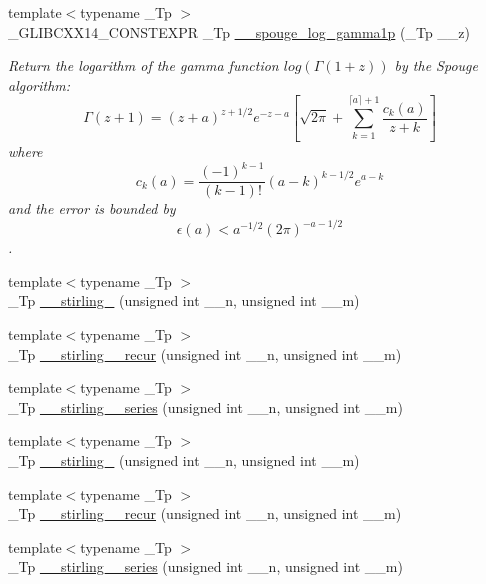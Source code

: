 \begin{DoxyCompactItemize}
{\footnotesize template$<$typename \+\_\+\+Tp $>$ }\\\+\_\+\+G\+L\+I\+B\+C\+X\+X14\+\_\+\+C\+O\+N\+S\+T\+E\+X\+PR \+\_\+\+Tp \hyperlink{namespacestd_1_1____detail_a29cdf96d3726e15cb0652736971ba5a9}{\+\_\+\+\_\+spouge\+\_\+log\+\_\+gamma1p} (\+\_\+\+Tp \+\_\+\+\_\+z)
\begin{DoxyCompactList}\small\item\em Return the logarithm of the gamma function $ log(\Gamma(1+z)) $ by the Spouge algorithm\+: \[ \Gamma(z+1) = (z+a)^{z+1/2}e^{-z-a}\left[ \sqrt{2\pi} + \sum_{k=1}^{\lceil a \rceil + 1}\frac{c_k(a)}{z+k}\right] \] where \[ c_k(a) = \frac{(-1)^{k-1}}{(k-1)!}(a-k)^{k-1/2}e^{a-k} \] and the error is bounded by \[ \epsilon(a) < a^{-1/2}(2\pi)^{-a-1/2} \]. \end{DoxyCompactList}\item 
{\footnotesize template$<$typename \+\_\+\+Tp $>$ }\\\+\_\+\+Tp \hyperlink{namespacestd_1_1____detail_a8b215e4ca28ec9b7b078d7f3d9aecc17}{\+\_\+\+\_\+stirling\+\_} (unsigned int \+\_\+\+\_\+n, unsigned int \+\_\+\+\_\+m)
\item 
{\footnotesize template$<$typename \+\_\+\+Tp $>$ }\\\+\_\+\+Tp \hyperlink{namespacestd_1_1____detail_a0a47b5d34956a55f438f2ba079680acd}{\+\_\+\+\_\+stirling\+\_\+\_\+recur} (unsigned int \+\_\+\+\_\+n, unsigned int \+\_\+\+\_\+m)
\item 
{\footnotesize template$<$typename \+\_\+\+Tp $>$ }\\\+\_\+\+Tp \hyperlink{namespacestd_1_1____detail_adb65db9b399228c604c5f72156695965}{\+\_\+\+\_\+stirling\+\_\+\_\+series} (unsigned int \+\_\+\+\_\+n, unsigned int \+\_\+\+\_\+m)
\item 
{\footnotesize template$<$typename \+\_\+\+Tp $>$ }\\\+\_\+\+Tp \hyperlink{namespacestd_1_1____detail_a4589d459a7a9d1d9e19b33601238a4af}{\+\_\+\+\_\+stirling\+\_} (unsigned int \+\_\+\+\_\+n, unsigned int \+\_\+\+\_\+m)
\item 
{\footnotesize template$<$typename \+\_\+\+Tp $>$ }\\\+\_\+\+Tp \hyperlink{namespacestd_1_1____detail_a23c6eb236cd8ddcfbe43e66ac23324db}{\+\_\+\+\_\+stirling\+\_\+\_\+recur} (unsigned int \+\_\+\+\_\+n, unsigned int \+\_\+\+\_\+m)
\item 
{\footnotesize template$<$typename \+\_\+\+Tp $>$ }\\\+\_\+\+Tp \hyperlink{namespacestd_1_1____detail_a8408f17699eb43a14447c7e4795b277f}{\+\_\+\+\_\+stirling\+\_\+\_\+series} (unsigned int \+\_\+\+\_\+n, unsigned int \+\_\+\+\_\+m)

\end{DoxyCompactItemize}
